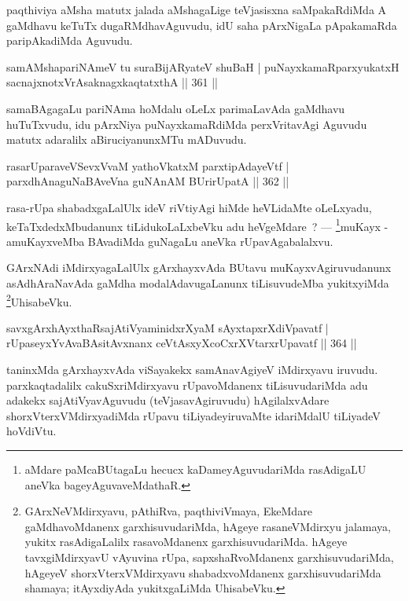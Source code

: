 \begin{artha}
paqthiviya aMsha matutx jalada aMshagaLige teVjasisxna saMpakaRdiMda A gaMdhavu keTuTx dugaRMdhavAguvudu, idU saha pArxNigaLa pApakamaRda paripAkadiMda Aguvudu.
\end{artha}

\begin{shl}
samAMshapariNAmeV tu suraBijARyateV shuBaH |
puNayxkamaRparxyukatxH sacnajxnotxVrAsaknagxkaqtatxthA \hfill || 361 ||
\end{shl}

\begin{artha}
samaBAgagaLu pariNAma hoMdalu oLeLx parimaLavAda gaMdhavu huTuTxvudu, idu pArxNiya puNayxkamaRdiMda perxVritavAgi Aguvudu matutx adaralilx aBiruciyanunxMTu mADuvudu.
\end{artha}

\begin{shl}
rasarUparaveVSevxVvaM yathoVkatxM parxtipAdayeVtf |
parxdhAnaguNaBAveVna guNAnAM BUrirUpatA \hfill  || 362 ||
\end{shl}

\begin{artha}
rasa-rUpa shabadxgaLalUlx ideV riVtiyAgi hiMde heVLidaMte oLeLxyadu, keTaTxdedxMbudanunx tiLidukoLaLxbeVku adu heVgeMdare~?  {\rm ---}  \footnote{aMdare paMcaBUtagaLu hecucx kaDameyAguvudariMda rasAdigaLU aneVka bageyAguvaveMdathaR.}muKayx - amuKayxveMba BAvadiMda guNagaLu aneVka rUpavAgabalalxvu.
\end{artha}

\begin{artha}
GArxNAdi iMdirxyagaLalUlx gArxhayxvAda BUtavu muKayxvAgiruvudanunx asAdhAraNavAda gaMdha modalAdavugaLanunx tiLisuvudeMba yukitxyiMda \footnote{GArxNeVMdirxyavu, pAthiRva, paqthiviVmaya, EkeMdare gaMdhavoMdanenx garxhisuvudariMda, hAgeye rasaneVMdirxyu jalamaya, yukitx rasAdigaLalilx rasavoMdanenx garxhisuvudariMda. hAgeye tavxgiMdirxyavU vAyuvina rUpa, sapxshaRvoMdanenx garxhisuvudariMda, hAgeyeV shorxVterxVMdirxyavu shabadxvoMdanenx garxhisuvudariMda shamaya; itAyxdiyAda yukitxgaLiMda UhisabeVku.}UhisabeVku.
\end{artha}

\begin{shl}
savxgArxhAyxthaRsajAtiVyaminidxrXyaM sAyxtapxrXdiVpavatf |
rUpaseyxYvAvaBAsitAvxnanx ceVtAsxyXcoCxrXVtarxrUpavatf \hfill || 364 ||
\end{shl}

\begin{artha}
taninxMda gArxhayxvAda viSayakekx samAnavAgiyeV iMdirxyavu iruvudu. parxkaqtadalilx cakuSxriMdirxyavu rUpavoMdanenx tiLisuvudariMda adu adakekx sajAtiVyavAguvudu (teVjasavAgiruvudu) hAgilalxvAdare shorxVterxVMdirxyadiMda rUpavu tiLiyadeyiruvaMte idariMdalU tiLiyadeV hoVdiVtu.
\end{artha}

